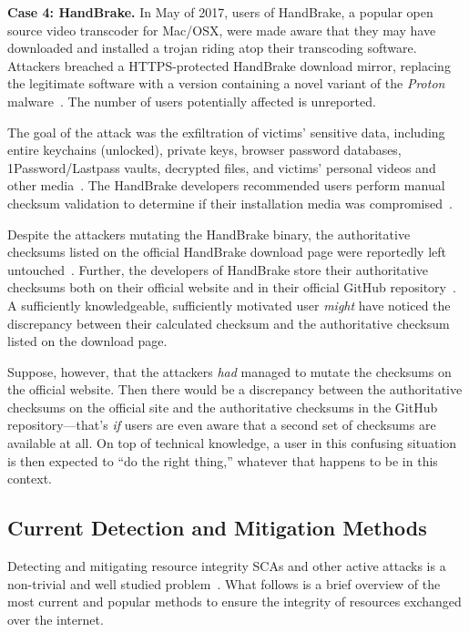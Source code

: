 \noindent\textbf{Case 4: HandBrake.} In May of 2017, users of HandBrake, a
popular open source video transcoder for Mac/OSX, were made aware that they may
have downloaded and installed a trojan riding atop their transcoding software.
Attackers breached a HTTPS-protected HandBrake download mirror, replacing the
legitimate software with a version containing a novel variant of the
\emph{Proton} malware~\cite{SCA-HB1}. The number of users potentially affected
is unreported.

The goal of the attack was the exfiltration of victims' sensitive data,
including entire keychains (unlocked), private keys, browser password databases,
1Password/Lastpass vaults, decrypted files, and victims' personal videos and
other media~\cite{SCA-HB1}. The HandBrake developers recommended users perform
manual checksum validation to determine if their installation media was
compromised~\cite{SCA-HB2}.

Despite the attackers mutating the HandBrake binary, the authoritative checksums
listed on the official HandBrake download page were reportedly left
untouched~\cite{SCA-HB2}. Further, the developers of HandBrake store their
authoritative checksums both on their official website and in their official
GitHub repository~\cite{SCA-HB2}. A sufficiently knowledgeable, sufficiently
motivated user \emph{might} have noticed the discrepancy between their
calculated checksum and the authoritative checksum listed on the download page.

Suppose, however, that the attackers \textit{had} managed to mutate the
checksums on the official website. Then there would be a discrepancy between the
authoritative checksums on the official site and the authoritative checksums in
the GitHub repository---that's \emph{if} users are even aware that a second set
of checksums are available at all. On top of technical knowledge, a user in this
confusing situation is then expected to ``do the right thing,'' whatever that
happens to be in this context.

\subsection{Current Detection and Mitigation Methods}

Detecting and mitigating resource integrity SCAs and other active attacks is a
non-trivial and well studied problem~\cite{MD5Header, HTTP1.1, HTTPS, SRI, LF,
OpenPGP1, DNSSEC, PKI}. What follows is a brief overview of the most current and
popular methods to ensure the integrity of resources exchanged over the
internet.

